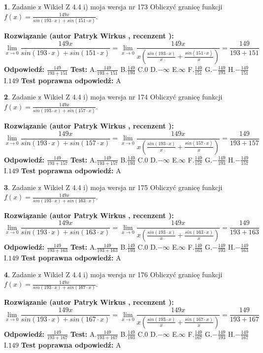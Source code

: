 \documentclass[12pt, a4paper]{article}
\theoremstyle{definition} %
\newtheorem{zad}{}
\newcommand{\zadStart}[1]{\begin{zad}#1\newline}
\newcommand{\zadStop}{\end{zad}}
\newcommand{\rozwStart}[2]{\noindent \textbf{Rozwiązanie (autor #1 , recenzent #2): }\newline}
\newcommand{\rozwStop}{\newline}
\newcommand{\odpStart}{\noindent \textbf{Odpowiedź:}\newline}
\newcommand{\odpStop}{\newline}
\newcommand{\testStart}{\noindent \textbf{Test:}\newline}
\newcommand{\testStop}{\newline}
\newcommand{\kluczStart}{\noindent \textbf{Test poprawna odpowiedź:}\newline}
\newcommand{\kluczStop}{\newline}
\begin{document}
\zadStart{Zadanie z Wikieł Z 4.4 i) moja wersja nr 173}
Obliczyć granicę funkcji $f(x)=\frac{149x}{sin(193\cdot x) +sin(151\cdot x)}$.
\zadStop
\rozwStart{Patryk Wirkus}{}
$$\lim\limits_{x\to 0}\frac{149x}{sin(193\cdot x) +sin(151\cdot x)}=\lim\limits_{x\to 0}\frac{149x}{x(\frac{sin(193\cdot x)}{x}+\frac{sin(151\cdot x)}{x})}=\frac{149}{193+151}$$
\rozwStop
\odpStart
$\frac{149}{193+151}$
\odpStop
\testStart
A.$\frac{149}{193+151}$
B.$\frac{149}{193}$
C.$0$
D.$-\infty$
E.$\infty$
F.$\frac{149}{151}$
G.$-\frac{149}{193}$
H.$-\frac{149}{151}$
I.$149$
\testStop
\kluczStart
A
\kluczStop



\zadStart{Zadanie z Wikieł Z 4.4 i) moja wersja nr 174}
Obliczyć granicę funkcji $f(x)=\frac{149x}{sin(193\cdot x) +sin(157\cdot x)}$.
\zadStop
\rozwStart{Patryk Wirkus}{}
$$\lim\limits_{x\to 0}\frac{149x}{sin(193\cdot x) +sin(157\cdot x)}=\lim\limits_{x\to 0}\frac{149x}{x(\frac{sin(193\cdot x)}{x}+\frac{sin(157\cdot x)}{x})}=\frac{149}{193+157}$$
\rozwStop
\odpStart
$\frac{149}{193+157}$
\odpStop
\testStart
A.$\frac{149}{193+157}$
B.$\frac{149}{193}$
C.$0$
D.$-\infty$
E.$\infty$
F.$\frac{149}{157}$
G.$-\frac{149}{193}$
H.$-\frac{149}{157}$
I.$149$
\testStop
\kluczStart
A
\kluczStop



\zadStart{Zadanie z Wikieł Z 4.4 i) moja wersja nr 175}
Obliczyć granicę funkcji $f(x)=\frac{149x}{sin(193\cdot x) +sin(163\cdot x)}$.
\zadStop
\rozwStart{Patryk Wirkus}{}
$$\lim\limits_{x\to 0}\frac{149x}{sin(193\cdot x) +sin(163\cdot x)}=\lim\limits_{x\to 0}\frac{149x}{x(\frac{sin(193\cdot x)}{x}+\frac{sin(163\cdot x)}{x})}=\frac{149}{193+163}$$
\rozwStop
\odpStart
$\frac{149}{193+163}$
\odpStop
\testStart
A.$\frac{149}{193+163}$
B.$\frac{149}{193}$
C.$0$
D.$-\infty$
E.$\infty$
F.$\frac{149}{163}$
G.$-\frac{149}{193}$
H.$-\frac{149}{163}$
I.$149$
\testStop
\kluczStart
A
\kluczStop



\zadStart{Zadanie z Wikieł Z 4.4 i) moja wersja nr 176}
Obliczyć granicę funkcji $f(x)=\frac{149x}{sin(193\cdot x) +sin(167\cdot x)}$.
\zadStop
\rozwStart{Patryk Wirkus}{}
$$\lim\limits_{x\to 0}\frac{149x}{sin(193\cdot x) +sin(167\cdot x)}=\lim\limits_{x\to 0}\frac{149x}{x(\frac{sin(193\cdot x)}{x}+\frac{sin(167\cdot x)}{x})}=\frac{149}{193+167}$$
\rozwStop
\odpStart
$\frac{149}{193+167}$
\odpStop
\testStart
A.$\frac{149}{193+167}$
B.$\frac{149}{193}$
C.$0$
D.$-\infty$
E.$\infty$
F.$\frac{149}{167}$
G.$-\frac{149}{193}$
H.$-\frac{149}{167}$
I.$149$
\testStop
\kluczStart
A
\kluczStop
\end{document}

